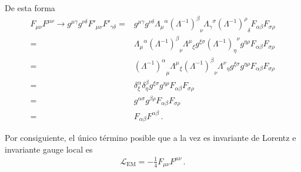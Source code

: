 De esta forma
\begin{align}
\label{eq:invlorff}
  F_{\mu\nu}F^{\mu\nu}\to   g^{\mu\gamma}g^{\nu\delta} F'_{\mu\nu} F'_{\gamma\delta}=&
  g^{\mu\gamma}g^{\nu\delta} { \Lambda_{\mu}}^{\alpha}  {\left( \Lambda^{-1} \right)^{\beta}}_{\nu}
{ \Lambda_{\gamma}}^{\sigma}  {\left( \Lambda^{-1} \right)^{\rho}}_{\delta}
F_{\alpha\beta}F_{\sigma\rho} \nonumber\\
  =&
   { \Lambda_{\mu}}^{\alpha}  {\left( \Lambda^{-1} \right)^{\beta}}_{\nu}
{ \Lambda^{\mu}}_{\xi}g^{\xi\sigma}  {\left( \Lambda^{-1} \right)_{\eta}}^{\nu}g^{\eta\rho}
F_{\alpha\beta}F_{\sigma\rho}  \nonumber\\
  =& {\left( \Lambda^{-1} \right)^{\alpha}}_{\mu} { \Lambda^{\mu}}_{\xi}
    {\left( \Lambda^{-1} \right)^{\beta}}_{\nu}
 {\Lambda^{\nu}}_{\eta} g^{\xi\sigma}  g^{\eta\rho}
F_{\alpha\beta}F_{\sigma\rho} \nonumber\\
  =& \delta^{\alpha}_{\xi}\delta^{\beta}_{\eta}g^{\xi\sigma}  g^{\eta\rho}
F_{\alpha\beta}F_{\sigma\rho} \nonumber\\
  =& g^{\alpha\sigma}  g^{\beta\rho}
F_{\alpha\beta}F_{\sigma\rho} \nonumber\\
  =& F_{\alpha\beta}F^{\alpha\beta}\,.
\end{align}



Por consiguiente, el único término posible que a la vez es invariante de Lorentz e invariante gauge local es
\begin{align}
  \label{eq:lemfree}
  \mathcal{L}_{\text{EM}}=-\frac{1}{4}F_{\mu\nu}F^{\mu\nu}\,.
\end{align}


